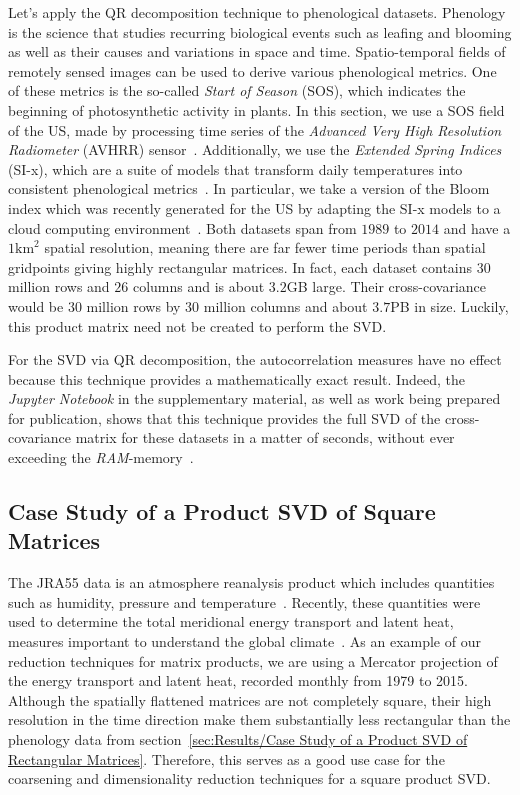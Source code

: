 \documentclass[ijgi,article,submit,moreauthors,pdftex,10pt,a4paper]{Definitions/mdpi}
\begin{document}
Let's apply the QR decomposition technique to phenological datasets. Phenology is the science that studies recurring biological events such as leafing and blooming as well as their causes and variations in space and time. Spatio-temporal fields of remotely sensed images can be used to derive various phenological metrics. One of these metrics is the so-called \textit{Start of Season} (SOS), which indicates the beginning of photosynthetic activity in plants. In this section, we use a SOS field of the US, made by processing time series of the \textit{Advanced Very High Resolution Radiometer} (AVHRR) sensor~\cite{Reed1994}. Additionally, we use the \textit{Extended Spring Indices} (SI-x), which are a suite of models that transform daily temperatures into consistent phenological metrics~\cite{Schwartz2013}. In particular, we take a version of the Bloom index which was recently generated for the US by adapting the SI-x models to a cloud computing environment~\cite{Izquierdo2015}. Both datasets span from $1989$ to $2014$ and have a $1\text{km}^2$ spatial resolution, meaning there are far fewer time periods than spatial gridpoints giving highly rectangular matrices. In fact, each dataset contains $30$ million rows and $26$ columns and is about $3.2$GB large. Their cross-covariance would be $30$ million rows by $30$ million columns and about $3.7$PB in size. Luckily, this product matrix need not be created to perform the SVD.

For the SVD via QR decomposition, the autocorrelation measures have no effect because this technique provides a mathematically exact result. Indeed, the \textit{Jupyter Notebook} in the supplementary material, as well as work being prepared for publication, shows that this technique provides the full SVD of the cross-covariance matrix for these datasets in a matter of seconds, without ever exceeding the \textit{RAM}-memory~\cite{Bogaardt2018, ZuritaMilla2018}.

\subsection{Case Study of a Product SVD of Square Matrices}
\label{sec:Results/Case Study of a Product SVD of Square Matrices}

The JRA55 data is an atmosphere reanalysis product which includes quantities such as humidity, pressure and temperature~\cite{Kobayashi2015}. Recently, these quantities were used to determine the total meridional energy transport and latent heat, measures important to understand the global climate~\cite{Liu2018}. As an example of our reduction techniques for matrix products, we are using a Mercator projection of the energy transport and latent heat, recorded monthly from 1979 to 2015. Although the spatially flattened matrices are not completely square, their high resolution in the time direction make them substantially less rectangular than the phenology data from section~\ref{sec:Results/Case Study of a Product SVD of Rectangular Matrices}. Therefore, this serves as a good use case for the coarsening and dimensionality reduction techniques for a square product SVD.
\end{document}

